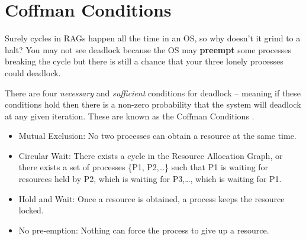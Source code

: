 \section{Coffman Conditions}

Surely cycles in RAGs happen all the time in an OS, so why doesn't it grind to a halt?
You may not see deadlock because the OS may \textbf{preempt} some processes breaking the cycle but there is still a chance that your three lonely processes could deadlock.

There are four \emph{necessary} and \emph{sufficient} conditions for deadlock -- meaning if these conditions hold then there is a non-zero probability that the system will deadlock at any given iteration.
These are known as the Coffman Conditions \cite{coffman1971system}.

\begin{itemize}
	\tightlist
	\item
	      Mutual Exclusion: No two processes can obtain a resource at the same time.
	\item
	      Circular Wait: There exists a cycle in the Resource Allocation Graph, or there exists a set of processes \{P1, P2,\ldots{}\} such that P1 is waiting for resources held by P2, which is waiting for P3,\ldots{}, which is waiting for P1.
	\item
	      Hold and Wait: Once a resource is obtained, a process keeps the resource locked.
	\item
	      No pre-emption: Nothing can force the process to give up a resource.
\end{itemize}

